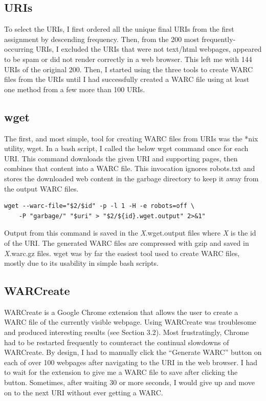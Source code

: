 \documentclass[a4paper,12pt]{article}
\begin{document}
\subsection{URIs}
To select the URIs, I first ordered all the unique final URIs from the first assignment by descending frequency.
Then, from the 200 most frequently-occurring URIs, I excluded the URIs that were not text/html webpages,
appeared to be spam or did not render correctly in a web browser. This left me with 144 URIs of the original
200. Then, I started using the three tools to create WARC files from the URIs until I had successfully created a
WARC file using at least one method from a few more than 100 URIs.

\subsection{wget}
The first, and most simple, tool for creating WARC files from URIs was the *nix utility, wget. In a bash script,
I called the below wget command once for each URI. This command downloads the given URI and supporting pages,
then combines that content into a WARC file. This invocation ignores robots.txt and stores the downloaded web
content in the garbage directory to keep it away from the output WARC files.
\begin{lstlisting}[basicstyle=\ttfamily]
    wget --warc-file="$2/$id" -p -l 1 -H -e robots=off \
    -P "garbage/" "$uri" > "$2/${id}.wget.output" 2>&1"
\end{lstlisting}
Output from this command is saved in the \emph{X}.wget.output files where \emph{X} is the id of the URI. The
generated WARC files are compressed with gzip and saved in \emph{X}.warc.gz files. wget was by far the easiest
tool used to create WARC files, mostly due to its usability in simple bash scripts.

\subsection{WARCreate}
WARCreate is a Google Chrome extension that allows the user to create a WARC file of the currently visible
webpage. Using WARCreate was troublesome and produced interesting results (see Section 3.2). Most frustratingly,
Chrome had to be restarted frequently to counteract the continual slowdowns of WARCreate. By design, I had to
manually click the ``Generate WARC'' button on each of over 100 webpages after navigating to the URI in
the web browser. I had to wait for the extension to give
me a WARC file to save after clicking the button.
Sometimes, after waiting 30 or more seconds, I would give up and move on to the next URI without ever getting
a WARC.
\end{document}
